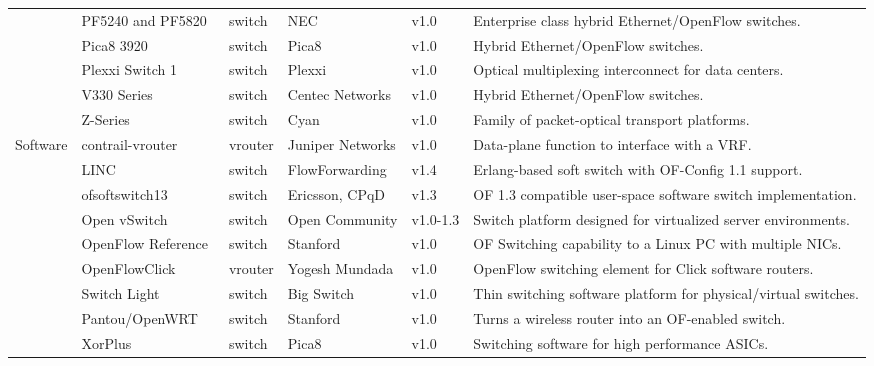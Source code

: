 {\begin{table}[!htp]
\begin{center}
\begin{tabularx}{\linewidth}{p{1.1cm}p{3.1cm}p{0.9cm}p{2.4cm}p{0.95cm}X}
& PF5240 and PF5820~\cite{nec2013-2} & switch & NEC & v1.0 & Enterprise class hybrid Ethernet/OpenFlow switches. \\\cline{2-6}
& Pica8 3920~\cite{pica8opennetworking2013} & switch & Pica8 & v1.0 & Hybrid Ethernet/OpenFlow switches. \\\cline{2-6}
& Plexxi Switch 1~\cite{plexxi2013} & switch & Plexxi & v1.0 & Optical multiplexing interconnect for data centers. \\\cline{2-6}
& V330 Series~\cite{centecnetworks2013} & switch & Centec Networks & v1.0 & Hybrid Ethernet/OpenFlow switches. \\\cline{2-6}
& Z-Series~\cite{cyan2013} & switch & Cyan & v1.0 & Family of packet-optical transport platforms.\\
\hline
\multirow{9}{*}{Software} 
& contrail-vrouter~\cite{networks2013} & vrouter &  Juniper Networks & v1.0 & Data-plane function to interface with a VRF.\\\cline{2-6}
& LINC~\cite{flowforwarding2013,rutka2013} & switch &  FlowForwarding & v1.4 & Erlang-based soft switch with OF-Config 1.1 support.\\\cline{2-6}
& ofsoftswitch13~\cite{cpqd2013} & switch & Ericsson, CPqD & v1.3 & OF 1.3 compatible user-space software switch implementation. \\\cline{2-6}
& Open vSwitch~\cite{listofcontributors2013,pfaff2009} & switch & Open Community & v1.0-1.3  & Switch platform designed for virtualized server environments.  \\\cline{2-6}
& OpenFlow Reference~\cite{openflowcommunity2009} & switch & Stanford & v1.0 & OF Switching capability to a Linux PC with multiple NICs. \\\cline{2-6}
& OpenFlowClick~\cite{mundada2009} & vrouter & Yogesh Mundada & v1.0 & OpenFlow switching element for Click software routers.\\\cline{2-6}
& Switch Light~\cite{bigswitchnetworks2013} & switch & Big Switch & v1.0  & Thin switching software platform for physical/virtual switches. \\\cline{2-6}
& Pantou/OpenWRT~\cite{yiakoumis2011} & switch & Stanford  & v1.0 & Turns a wireless router into an OF-enabled switch. \\\cline{2-6}
& XorPlus~\cite{shang2014} & switch &  Pica8 & v1.0 & Switching software for high performance ASICs.\\
\hline
\end{tabularx}
\end{center}
\end{table}
}

